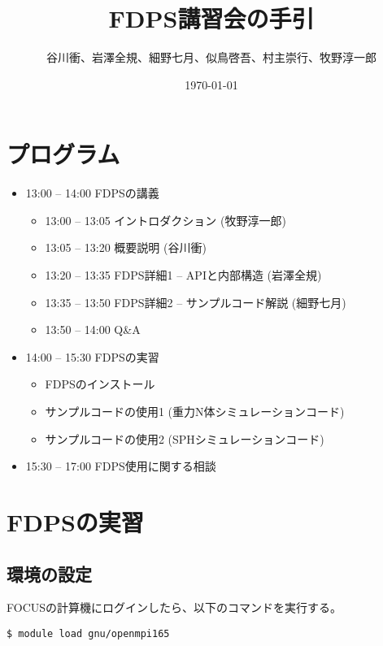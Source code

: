 \documentclass[12pt,a4paper]{jarticle}
\title{FDPS講習会の手引}
\author{谷川衝、岩澤全規、細野七月、似鳥啓吾、村主崇行、牧野淳一郎}
\date{\today}
\begin{document}
\maketitle
\tableofcontents

\newpage

\section{プログラム}

\begin{itemize}

\item 13:00 -- 14:00 FDPSの講義
  \begin{itemize}
  \item 13:00 -- 13:05 イントロダクション (牧野淳一郎)
  \item 13:05 -- 13:20 概要説明 (谷川衝)
  \item 13:20 -- 13:35 FDPS詳細1 -- APIと内部構造 (岩澤全規)
  \item 13:35 -- 13:50 FDPS詳細2 -- サンプルコード解説 (細野七月)
  \item 13:50 -- 14:00 Q\&A
  \end{itemize}

\item 14:00 -- 15:30 FDPSの実習
  \begin{itemize}
  \item FDPSのインストール
  \item サンプルコードの使用1 (重力N体シミュレーションコード)
  \item サンプルコードの使用2 (SPHシミュレーションコード)
  \end{itemize}

\item 15:30 -- 17:00 FDPS使用に関する相談

\end{itemize}

\newpage

\section{FDPSの実習}

\subsection{環境の設定}

FOCUSの計算機にログインしたら、以下のコマンドを実行する。
\begin{screen}
\begin{verbatim}
$ module load gnu/openmpi165
\end{verbatim}
\end{screen}
\end{document}
